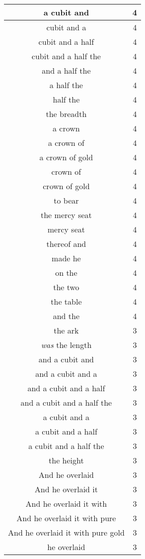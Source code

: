 \begin{center}
\begin{longtable}{|c|c|}
a cubit and & 4\\ \hline 
cubit and a & 4\\ \hline 
cubit and a half & 4\\ \hline 
cubit and a half the & 4\\ \hline 
and a half the & 4\\ \hline 
a half the & 4\\ \hline 
half the & 4\\ \hline 
the breadth & 4\\ \hline 
a crown & 4\\ \hline 
a crown of & 4\\ \hline 
a crown of gold & 4\\ \hline 
crown of & 4\\ \hline 
crown of gold & 4\\ \hline 
to bear & 4\\ \hline 
the mercy seat & 4\\ \hline 
mercy seat & 4\\ \hline 
thereof and & 4\\ \hline 
made he & 4\\ \hline 
on the & 4\\ \hline 
the two & 4\\ \hline 
the table & 4\\ \hline 
and the & 4\\ \hline 
the ark & 3\\ \hline 
\emph{was} the length & 3\\ \hline 
and a cubit and & 3\\ \hline 
and a cubit and a & 3\\ \hline 
and a cubit and a half & 3\\ \hline 
and a cubit and a half the & 3\\ \hline 
a cubit and a & 3\\ \hline 
a cubit and a half & 3\\ \hline 
a cubit and a half the & 3\\ \hline 
the height & 3\\ \hline 
And he overlaid & 3\\ \hline 
And he overlaid it & 3\\ \hline 
And he overlaid it with & 3\\ \hline 
And he overlaid it with pure & 3\\ \hline 
And he overlaid it with pure gold & 3\\ \hline 
he overlaid & 3\\ \hline 

\end{longtable}
\end{center}
